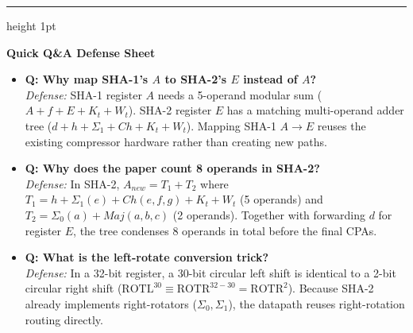 \documentclass[11pt,a4paper]{article}
\begin{document}
\vspace{0.8em}
\hrule height 1pt
\vspace{0.5em}

{\large\bfseries\color{iiscblue} Quick Q\&A Defense Sheet}

\vspace{0.2em}
\begin{itemize}[leftmargin=1.5em, itemsep=4pt]
    \item \textbf{Q: Why map SHA-1's $A$ to SHA-2's $E$ instead of $A$?} \\
    \textit{Defense:} SHA-1 register $A$ needs a 5-operand modular sum ($A + f + E + K_t + W_t$). SHA-2 register $E$ has a matching multi-operand adder tree ($d + h + \Sigma_1 + Ch + K_t + W_t$). Mapping SHA-1 $A \to E$ reuses the existing compressor hardware rather than creating new paths.
    \item \textbf{Q: Why does the paper count 8 operands in SHA-2?} \\
    \textit{Defense:} In SHA-2, $A_{new} = T_1 + T_2$ where $T_1 = h + \Sigma_1(e) + Ch(e,f,g) + K_t + W_t$ (5 operands) and $T_2 = \Sigma_0(a) + Maj(a,b,c)$ (2 operands). Together with forwarding $d$ for register $E$, the tree condenses 8 operands in total before the final CPAs.
    \item \textbf{Q: What is the left-rotate conversion trick?} \\
    \textit{Defense:} In a 32-bit register, a 30-bit circular left shift is identical to a 2-bit circular right shift ($\text{ROTL}^{30} \equiv \text{ROTR}^{32-30} = \text{ROTR}^2$). Because SHA-2 already implements right-rotators ($\Sigma_0, \Sigma_1$), the datapath reuses right-rotation routing directly.
\end{itemize}
\end{document}
